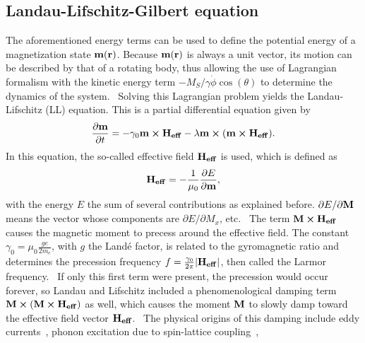\documentclass[10pt,a4paper]{article}
\begin{document}
\subsection{Landau-Lifschitz-Gilbert equation}
The aforementioned energy terms can be used to define the potential energy of a magnetization state $\vb{m}(\vb{r})$. Because $\vb{m}(\vb{r})$ is always a unit vector, its motion can be described by that of a rotating body, thus allowing the use of Lagrangian formalism with the kinetic energy term $-M_S/\gamma \dot{\phi} \cos(\theta)$ to determine the dynamics of the system.~\cite{abert2013discrete} Solving this Lagrangian problem yields the Landau-Lifschitz (LL) equation. This is a partial differential equation given by~\cite{phd_leliaert}
\begin{equation}
	\frac{\partial \vb{m}}{\partial t} = - \gamma_0 \vb{m} \cross \vb{H_{eff}} - \lambda \vb{m} \cross (\vb{m} \cross \vb{H_{eff}}) \mathrm{.}
	\label{eq:LL}
\end{equation}
In this equation, the so-called effective field $\vb{H_{eff}}$ is used, which is defined as
\begin{equation}
	\vb{H_{eff}} = - \frac{1}{\mu_0} \frac{\partial E}{\partial \vb{m}} \mathrm{,}
	\label{eq:H_eff}
\end{equation}
with the energy $E$ the sum of several contributions as explained before. $\partial E/\partial \vb{M}$ means the vector whose components are $\partial E/\partial M_x$, etc.~\cite{ThermFluc_SingleDomain} 
The term $\vb{M} \cross \vb{H_{eff}}$ causes the magnetic moment to precess around the effective field. The constant $\gamma_0 = \mu_0 \frac{ge}{2m_e}$, with $g$ the Landé factor, is related to the gyromagnetic ratio and determines the precession frequency $f=\frac{\gamma_0}{2\pi}\abs{\vb{H_{eff}}}$, then called the Larmor frequency.~\cite{phd_leliaert} If only this first term were present, the precession would occur forever, so Landau and Lifschitz included a phenomenological damping term $\vb{M} \cross (\vb{M} \cross \vb{H_{eff}})$ as well, which causes the moment $\vb{M}$ to slowly damp toward the effective field vector $\vb{H_{eff}}$.~\cite{NML_Carlton} The physical origins of this damping include eddy currents~\cite{phd_leliaert}, phonon excitation due to spin-lattice coupling~\cite{phd_leliaert}, %
\end{document}

